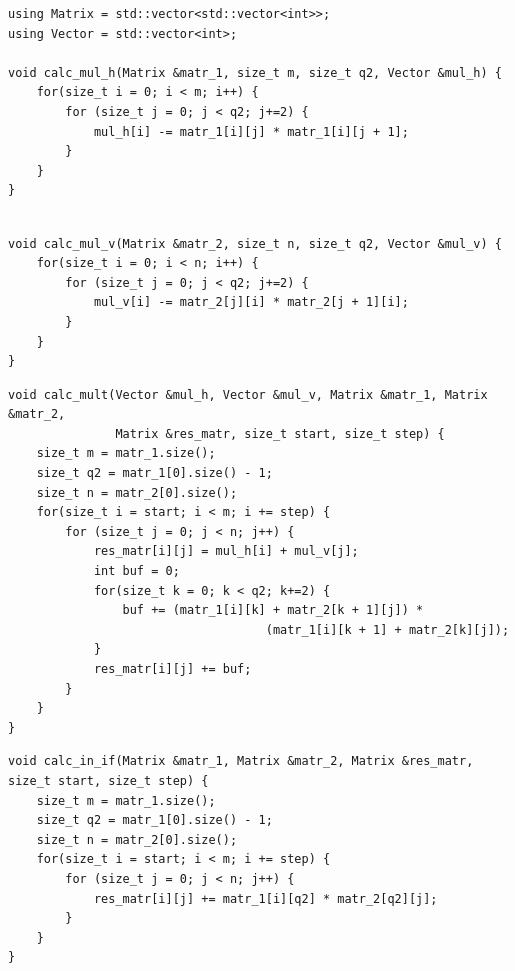 \documentclass[a4paper,12pt]{article}
\begin{document}
	\begin{center}
	\begin{lstlisting}[label=code_h, caption={Функция вычисления горизонтальных произведений}]
using Matrix = std::vector<std::vector<int>>;
using Vector = std::vector<int>;

void calc_mul_h(Matrix &matr_1, size_t m, size_t q2, Vector &mul_h) {
    for(size_t i = 0; i < m; i++) {
        for (size_t j = 0; j < q2; j+=2) {
            mul_h[i] -= matr_1[i][j] * matr_1[i][j + 1];
        }
    }
}


    \end{lstlisting}
    \end{center}  

     
	\begin{lstlisting}[label=code_v, caption={Функция вычисления вертикальных произведений}]
void calc_mul_v(Matrix &matr_2, size_t n, size_t q2, Vector &mul_v) {
    for(size_t i = 0; i < n; i++) {
        for (size_t j = 0; j < q2; j+=2) {
            mul_v[i] -= matr_2[j][i] * matr_2[j + 1][i];
        }
    }
}

\end{lstlisting}


	\begin{lstlisting}[label=code_m, caption={Функция вычислений в тройном цикле}]
void calc_mult(Vector &mul_h, Vector &mul_v, Matrix &matr_1, Matrix &matr_2,
               Matrix &res_matr, size_t start, size_t step) {
    size_t m = matr_1.size();
    size_t q2 = matr_1[0].size() - 1;
    size_t n = matr_2[0].size();
    for(size_t i = start; i < m; i += step) {
        for (size_t j = 0; j < n; j++) {
            res_matr[i][j] = mul_h[i] + mul_v[j];
            int buf = 0;
            for(size_t k = 0; k < q2; k+=2) {
                buf += (matr_1[i][k] + matr_2[k + 1][j]) *
                                    (matr_1[i][k + 1] + matr_2[k][j]);
            }
            res_matr[i][j] += buf;
        }
    }
}

    \end{lstlisting}  
    
    
	\begin{lstlisting}[label=code_if, caption={Функция дополнительных вычислений для матриц нечетной размерности }]
	void calc_in_if(Matrix &matr_1, Matrix &matr_2, Matrix &res_matr, 											size_t start, size_t step) {
    size_t m = matr_1.size();
    size_t q2 = matr_1[0].size() - 1;
    size_t n = matr_2[0].size();
    for(size_t i = start; i < m; i += step) {
        for (size_t j = 0; j < n; j++) {
            res_matr[i][j] += matr_1[i][q2] * matr_2[q2][j];
        }
    }
}
	\end{lstlisting}  
	
\end{document}
